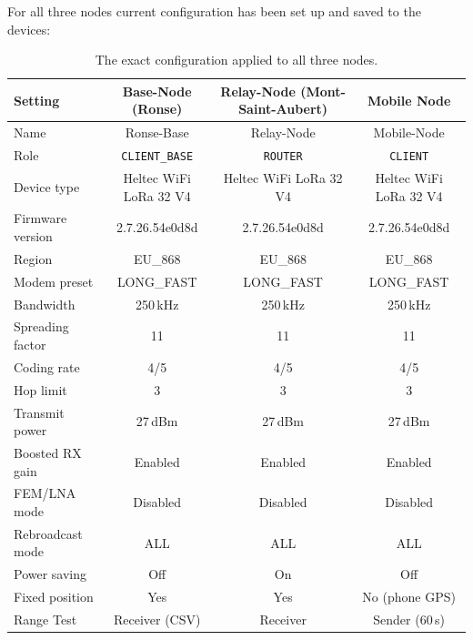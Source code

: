For all three nodes current configuration has been set up and saved to the devices:
\begin{table}[H]
  \centering
  \small
  \begin{tabular}{lccc}
    \toprule
    \textbf{Setting} & \textbf{Base-Node (Ronse)} & \textbf{Relay-Node (Mont-Saint-Aubert)} & \textbf{Mobile Node} \\
    \midrule
    Name                  & Ronse-Base & Relay-Node & Mobile-Node \\
    Role                  & \texttt{CLIENT\_BASE} & \texttt{ROUTER} & \texttt{CLIENT} \\
    Device type           & Heltec WiFi LoRa 32 V4 & Heltec WiFi LoRa 32 V4 & Heltec WiFi LoRa 32 V4 \\
    Firmware version      & 2.7.26.54e0d8d & 2.7.26.54e0d8d & 2.7.26.54e0d8d \\
    Region                & EU\_868 & EU\_868 & EU\_868 \\
    Modem preset          & LONG\_FAST & LONG\_FAST & LONG\_FAST \\
    Bandwidth             & 250\,kHz & 250\,kHz & 250\,kHz \\
    Spreading factor      & 11 & 11 & 11 \\
    Coding rate           & 4/5 & 4/5 & 4/5 \\
    Hop limit             & 3 & 3 & 3 \\
    Transmit power        & 27\,dBm & 27\,dBm & 27\,dBm \\
    Boosted RX gain       & Enabled & Enabled & Enabled \\
    FEM/LNA mode          & Disabled & Disabled & Disabled \\
    Rebroadcast mode      & ALL & ALL & ALL \\
    Power saving          & Off & On & Off \\
    Fixed position        & Yes & Yes & No (phone GPS) \\
    Range Test            & Receiver (CSV) & Receiver & Sender (60\,s) \\
    \bottomrule
  \end{tabular}
  \caption[Meshtastic node configuration.]{\label{tab:poc-config}The exact configuration applied to all three nodes.}
\end{table}

